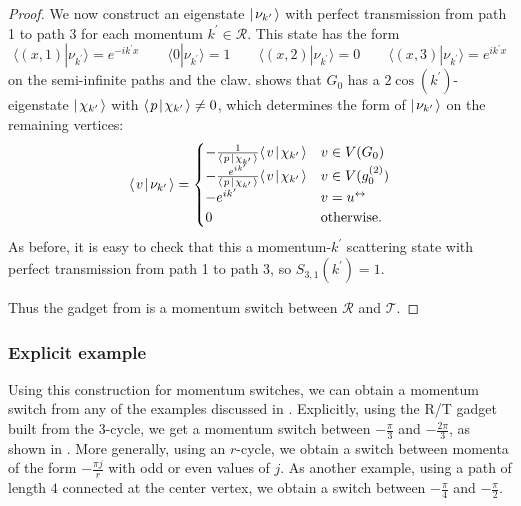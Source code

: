 \documentclass[../thesis-main/thesis-main]{subfiles}
\begin{document}
\begin{proof}
We now construct an eigenstate $|\mspace{2mu} \nu_{k^\prime} \mspace{2mu} \rangle$ with perfect transmission from path 1 to path 3 for each momentum $k^\prime \in \mathcal{R}$.  This state has the form
\begin{equation}
  \langle (x,1)|\nu_{k^\prime}\rangle=e^{-i k^\prime x} \qquad 
  \langle 0|\nu_{k^\prime}\rangle=1 \qquad 
  \langle (x,2)|\nu_{k^\prime}\rangle=0 \qquad
  \langle (x,3)|\nu_{k^\prime}\rangle=e^{i k^\prime x}
\end{equation}
on the semi-infinite paths and the claw.   shows that $G_0$ has a $2\cos(k^\prime)$-eigenstate $|\mspace{2mu} \chi_{k^\prime} \mspace{2mu} \rangle$ with $\langle\mspace{2mu} p \mspace{2mu} | \mspace{2mu} \chi_{k'}\mspace{2mu} \rangle \ne 0$, which determines the form of $|\mspace{2mu} \nu_{k^\prime} \mspace{2mu} \rangle$ on the remaining vertices:
\begin{equation}
  \langle\mspace{2mu} v \mspace{2mu} | \mspace{2mu} \nu_{k^\prime}\mspace{2mu} \rangle =
  \begin{cases}
	  -\frac{1}{\langle\mspace{2mu} p \mspace{2mu} | \mspace{2mu} \chi_{k'}\mspace{2mu} \rangle} \langle\mspace{2mu} v \mspace{2mu} | \mspace{2mu} \chi_{k^\prime}\mspace{2mu} \rangle & v \in V(G_0) \\
	  -\frac{e^{ik'}}{\langle\mspace{2mu} p \mspace{2mu} | \mspace{2mu} \chi_{k'}\mspace{2mu} \rangle} \langle\mspace{2mu} v \mspace{2mu} | \mspace{2mu} \chi_{k^\prime}\mspace{2mu} \rangle & v \in V(g_0^{(2)}) \\
	  -e^{ik'} & v=u^\leftrightarrow \\
    0 & \text{otherwise}.
  \end{cases} 
\end{equation}
As before, it is easy to check that this a momentum-$k^\prime$ scattering state with perfect transmission from path 1 to path 3, so $S_{3,1}(k^\prime)=1$.

Thus the gadget from  is a momentum switch between $\mathcal{R}$ and $\mathcal{T}$.
\end{proof}

\subsubsection{Explicit example}

Using this construction for momentum switches, we can obtain a momentum switch from any of the examples discussed in .  Explicitly, using the R/T gadget built from the 3-cycle, we get a momentum switch between $-\frac{\pi}{3}$ and $-\frac{2\pi}{3}$, as shown in .  More generally, using an $r$-cycle, we obtain a switch between momenta of the form $-\frac{\pi j}{r}$ with odd or even values of $j$.  As another example, using a path of length $4$ connected at the center vertex, we obtain a switch between $-\frac{\pi}{4}$ and $-\frac{\pi}{2}$.
\end{document}
